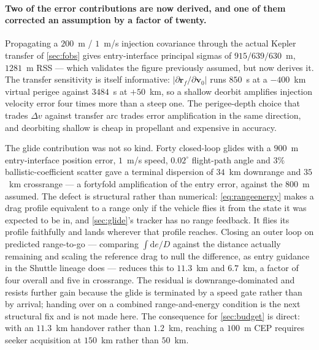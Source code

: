 \documentclass[11pt,a4paper]{article}
\theoremstyle{definition}
\numberwithin{equation}{section}
\begin{document}
\paragraph{Two of the error contributions are now derived, and one of them corrected an assumption by a factor of twenty.} Propagating a $200$~m / $1$~m/s injection covariance through the actual Kepler transfer of \cref{sec:fobs} gives entry-interface principal sigmas of $915/639/630$~m, $1281$~m RSS --- which validates the figure previously assumed, but now derives it. The transfer sensitivity is itself informative: $|\partial \mathbf{r}_f / \partial \mathbf{v}_0|$ runs $850$~s at a $-400$~km virtual perigee against $3484$~s at $+50$~km, so a shallow deorbit amplifies injection velocity error four times more than a steep one. The perigee-depth choice that trades $\Delta v$ against transfer arc trades error amplification in the same direction, and deorbiting shallow is cheap in propellant and expensive in accuracy.

The glide contribution was not so kind. Forty closed-loop glides with a $900$~m entry-interface position error, $1$~m/s speed, $0.02^\circ$ flight-path angle and $3\%$ ballistic-coefficient scatter gave a terminal dispersion of $34$~km downrange and $35$~km crossrange --- a fortyfold amplification of the entry error, against the $800$~m assumed. The defect is structural rather than numerical: \cref{eq:rangeenergy} makes a drag profile equivalent to a range only if the vehicle flies it from the state it was expected to be in, and \cref{sec:glide}'s tracker has no range feedback. It flies its profile faithfully and lands wherever that profile reaches. Closing an outer loop on predicted range-to-go --- comparing $\int \mathrm{d}e/D$ against the distance actually remaining and scaling the reference drag to null the difference, as entry guidance in the Shuttle lineage does --- reduces this to $11.3$~km and $6.7$~km, a factor of four overall and five in crossrange. The residual is downrange-dominated and resists further gain because the glide is terminated by a speed gate rather than by arrival; handing over on a combined range-and-energy condition is the next structural fix and is not made here. The consequence for \cref{sec:budget} is direct: with an $11.3$~km handover rather than $1.2$~km, reaching a $100$~m CEP requires seeker acquisition at $150$~km rather than $50$~km.
\end{document}
